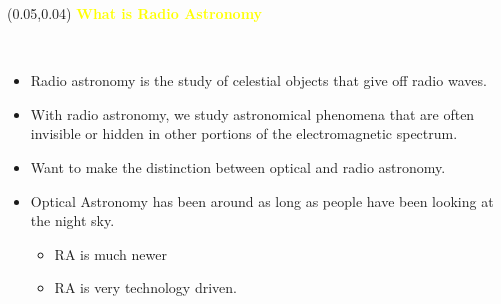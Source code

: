 \documentclass[aspectratio=169]{beamer} %
\begin{document}
\begin{frame}{}
	\setlength{\TPHorizModule}{\textwidth}
	\setlength{\TPVertModule}{\textwidth}
	\begin{textblock}{0.74}(0.05,0.04)
		\bfseries\huge\textcolor{yellow}{What is Radio Astronomy}\\~\\
	\end{textblock}
	\begin{columns}
		\begin{column}{0.6\textwidth}

			\begin{itemize}
				\color{yellow}
				\item Radio astronomy is the study of celestial objects that give off radio waves.
				\item With radio astronomy, we study astronomical phenomena that are often invisible or hidden in other portions of the electromagnetic spectrum.
				\item Want to make the distinction between optical and radio astronomy.
				\item Optical Astronomy has been around as long as people have been looking at the night sky.
				      \begin{itemize}
					      \color{yellow}
					      \item RA is much newer
					      \item RA is very technology driven.
				      \end{itemize}\end{itemize}


\end{column}
\end{columns}
\end{frame}
\end{document}
